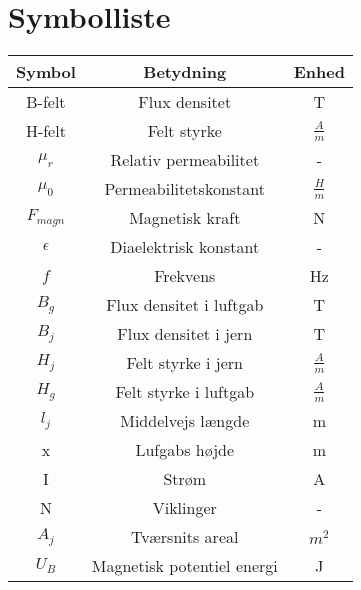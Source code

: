 \section{Symbolliste}

\begin{tabular}{|c|c|c|}
\hline 
Symbol & Betydning & Enhed \\ 
\hline 
B-felt & Flux densitet & T \\ 
\hline 
H-felt & Felt styrke & $\frac{A}{m}$\\
\hline 
$\mu_{r}$ & Relativ permeabilitet & - \\
\hline 
$\mu_{0}$ & Permeabilitetskonstant & $\frac{H}{m}$\\
\hline 
$F_{magn}$ & Magnetisk kraft & N \\
\hline
$\epsilon$ & Diaelektrisk konstant & - \\
\hline
$f$ & Frekvens & Hz \\
\hline
$B_{g}$ & Flux densitet i luftgab  & T \\
\hline
$ B_{j}$ & Flux densitet i jern & T \\
\hline
$ H_{j} $ & Felt styrke i jern & $\frac{A}{m}$ \\
\hline
$ H_{g} $ & Felt styrke i luftgab & $\frac{A}{m}$ \\
\hline
$ l_{j} $ & Middelvejs længde & m \\
\hline
x & Lufgabs højde	& m \\
\hline
I & Strøm & A \\
\hline
N & Viklinger & - \\
\hline
$ A_{j} $ & Tværsnits areal & $ m^2 $ \\
\hline
$ U_{B} $ & Magnetisk potentiel energi & J \\
\hline
\end{tabular} 
